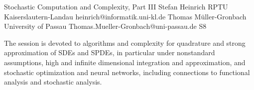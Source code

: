 

\clearpage

\begin{session}
 {Stochastic Computation and Complexity, Part III}%
 {Stefan Heinrich}%
 {RPTU Kaiserslautern-Landau}%
 {heinrich@informatik.uni-kl.de}%
 {Thomas M\"uller-Gronbach}%
 {University of Passau}%
 {Thomas.Mueller-Gronbach@uni-passau.de}%
 {S8}%
 {}%

 The session is devoted to algorithms and complexity for
 quadrature and strong approximation of SDEs and SPDEs, in particular under nonstandard assumptions,
 high and infinite dimensional integration and approximation, and
 stochastic optimization and neural networks,
 including connections to functional analysis and stochastic analysis.
 \medskip
\end{session}



\clearpage

